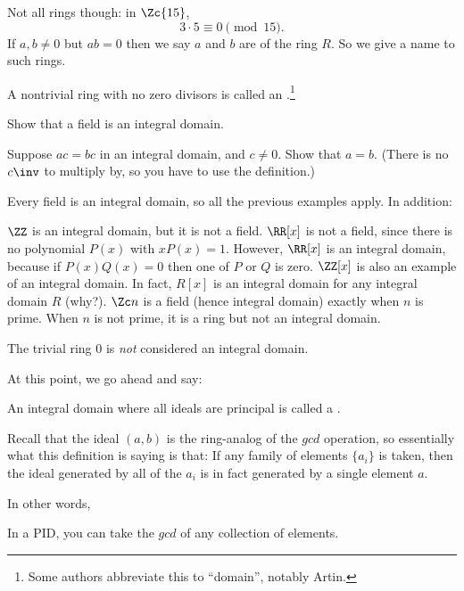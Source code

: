 Not all rings though: in $\Zc{15}$,
\[ 3 \cdot 5 \equiv 0 \pmod{15}. \]
If $a, b \neq 0$ but $ab=0$ then we say $a$ and $b$ are 
of the ring $R$.
So we give a name to such rings.
\begin{definition}
	A nontrivial ring with no zero divisors
	is called an .\footnote{Some
		authors abbreviate this to ``domain'', notably Artin.}
\end{definition}
\begin{ques}
	Show that a field is an integral domain.
\end{ques}
\begin{exercise}
	Suppose $ac = bc$ in an integral domain, and $c \neq 0$.
	Show that $a = b$.
	(There is no $c\inv$ to multiply by,
	so you have to use the definition.)
\end{exercise}

\begin{example}
	Every field is an integral domain,
	so all the previous examples apply.
	In addition:
	\begin{enumerate}[(a)]
		\ii $\ZZ$ is an integral domain, but it is not a field.
		\ii $\RR[x]$ is not a field,
		since there is no polynomial $P(x)$ with $xP(x) = 1$.
		However, $\RR[x]$ is an integral domain,
		because if $P(x) Q(x) = 0$ then one of $P$ or $Q$ is zero.
		\ii $\ZZ[x]$ is also an example of an integral domain.
		In fact, $R[x]$ is an integral domain for any integral domain $R$ (why?).
		\ii $\Zc n$ is a field (hence integral domain)
		exactly when $n$ is prime.
		When $n$ is not prime, it is a ring but not an integral domain.
	\end{enumerate}
	The trivial ring $0$ is \emph{not} considered an integral domain.
\end{example}

At this point, we go ahead and say:
\begin{definition}
	An integral domain where all ideals are principal
	is called a .
\end{definition}

Recall that the ideal $(a, b)$ is the ring-analog of the $gcd$ operation, so essentially what this
definition is saying is that:
If any family of elements $\{ a_i \}$ is taken, then the ideal generated by all of the $a_i$ is in
fact generated by a single element $a$.

In other words,
\begin{moral}
	In a PID, you can take the $gcd$ of any collection of elements.
\end{moral}

